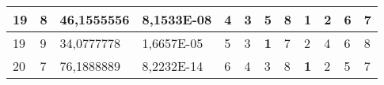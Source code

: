 \documentclass[conference]{IEEEtran}
\begin{document}
\begin{table*}[]
\begin{tabular}{|llll|llllllll|}
\multicolumn{1}{|l|}{19}                                                    & \multicolumn{1}{l|}{8}                                                        & \multicolumn{1}{l|}{46,1555556}                                                   & 8,1533E-08                     & \multicolumn{1}{l|}{4}                                                  & \multicolumn{1}{l|}{3}                                                  & \multicolumn{1}{l|}{5}                                                  & \multicolumn{1}{l|}{8}                                                  & \multicolumn{1}{l|}{\textbf{1}}                                         & \multicolumn{1}{l|}{2}                                                  & \multicolumn{1}{l|}{6}                                                  & 7                          \\ \hline
\multicolumn{1}{|l|}{19}                                                    & \multicolumn{1}{l|}{9}                                                        & \multicolumn{1}{l|}{34,0777778}                                                   & 1,6657E-05                     & \multicolumn{1}{l|}{5}                                                  & \multicolumn{1}{l|}{3}                                                  & \multicolumn{1}{l|}{\textbf{1}}                                         & \multicolumn{1}{l|}{7}                                                  & \multicolumn{1}{l|}{2}                                                  & \multicolumn{1}{l|}{4}                                                  & \multicolumn{1}{l|}{6}                                                  & 8                          \\ \hline
\multicolumn{1}{|l|}{20}                                                    & \multicolumn{1}{l|}{7}                                                        & \multicolumn{1}{l|}{76,1888889}                                                   & 8,2232E-14                     & \multicolumn{1}{l|}{6}                                                  & \multicolumn{1}{l|}{4}                                                  & \multicolumn{1}{l|}{3}                                                  & \multicolumn{1}{l|}{8}                                                  & \multicolumn{1}{l|}{\textbf{1}}                                         & \multicolumn{1}{l|}{2}                                                  & \multicolumn{1}{l|}{5}                                                  & 7                          \\ \hline

\end{tabular}
\end{table*}
\end{document}
